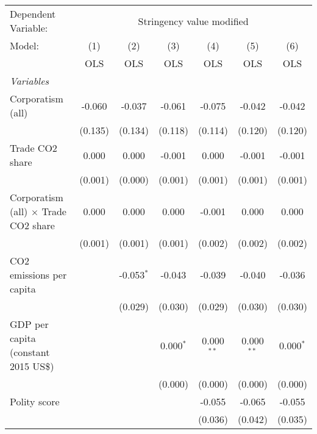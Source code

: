 
\begingroup
\centering
\begin{tabular}{lcccccc}
   \toprule
   Dependent Variable: & \multicolumn{6}{c}{Stringency value modified}\\
   Model:                                      & (1)     & (2)          & (3)         & (4)          & (5)          & (6)\\  
                                               &  OLS    & OLS          & OLS         & OLS          & OLS          & OLS\\  
   \midrule
   \emph{Variables}\\
   Corporatism (all)                           & -0.060  & -0.037       & -0.061      & -0.075       & -0.042       & -0.042\\   
                                               & (0.135) & (0.134)      & (0.118)     & (0.114)      & (0.120)      & (0.120)\\   
   Trade CO2 share                             & 0.000   & 0.000        & -0.001      & 0.000        & -0.001       & -0.001\\   
                                               & (0.001) & (0.000)      & (0.001)     & (0.001)      & (0.001)      & (0.001)\\   
   Corporatism (all) $\times$ Trade CO2 share  & 0.000   & 0.000        & 0.000       & -0.001       & 0.000        & 0.000\\   
                                               & (0.001) & (0.001)      & (0.001)     & (0.002)      & (0.002)      & (0.002)\\   
   CO2 emissions per capita                    &         & -0.053$^{*}$ & -0.043      & -0.039       & -0.040       & -0.036\\   
                                               &         & (0.029)      & (0.030)     & (0.029)      & (0.030)      & (0.030)\\   
   GDP per capita (constant 2015 US\$)         &         &              & 0.000$^{*}$ & 0.000$^{**}$ & 0.000$^{**}$ & 0.000$^{*}$\\   
                                               &         &              & (0.000)     & (0.000)      & (0.000)      & (0.000)\\   
   Polity score                                &         &              &             & -0.055       & -0.065       & -0.055\\   
                                               &         &              &             & (0.036)      & (0.042)      & (0.035)\\   

\end{tabular}
